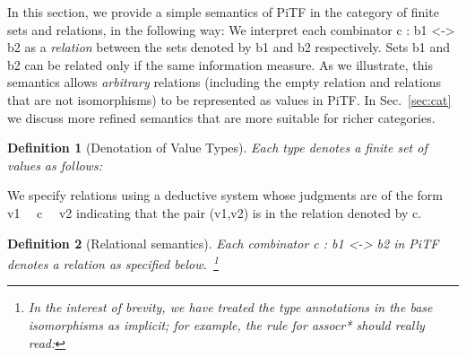 \documentclass[preprint]{sigplanconf}
\newtheorem{definition}{Definition}
\begin{document}
In this section, we provide a simple semantics of {{PiTF}} in the
category of finite sets and relations, in the following way: We
interpret each combinator {{c : b1 <-> b2}} as a \emph{relation}
between the sets denoted by {{b1}} and {{b2}} respectively. Sets
{{b1}} and {{b2}} can be related only if the same information measure.
As we illustrate, this semantics allows \emph{arbitrary} relations
(including the empty relation and relations that are not isomorphisms)
to be represented as values in {{PiTF}}.  In Sec.~\ref{sec:cat} we
discuss more refined semantics that are more suitable for richer
categories.

\begin{definition}[Denotation of Value Types]
\label{chx:def:denot}
Each type denotes a finite set of values as follows:
\end{definition}

We specify
relations using a deductive system whose judgments are of the form 
{{ v1 ~~c~~ v2 }} indicating that the pair {{(v1,v2)}} is in the relation 
denoted by {{c}}.

\begin{definition}[Relational semantics]
\label{def:relational-PiTF}
Each combinator {{c : b1 <-> b2}} in {{PiTF}} denotes a relation
as specified below.~\footnote{
In the interest of brevity, we have treated the type annotations in the base
isomorphisms as implicit; for example, the rule for {{assocr*}} should really
read:

}
%
%
%
%
%
%
%
%
%
%
%
%
%
%
\end{definition}
\end{document}
